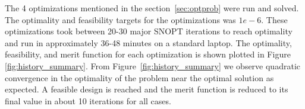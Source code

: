 \documentclass[conf]{new-aiaa}
\begin{document}

The 4 optimizations mentioned in the section~\ref{sec:optprob} were run and solved.
The optimality and feasibility targets for the optimizations was $1e-6$.
These optimizations took between 20-30 major SNOPT iterations to reach optimality and run in approximately 36-48 minutes on a standard laptop.
The optimality, feasibility, and merit function for each optimization is shown plotted in Figure \ref{fig:history_summary}.
From Figure~\ref{fig:history_summary} we observe quadratic convergence in the optimality of the problem near the optimal solution as expected.
A feasible design is reached and the merit function is reduced to its final value in about 10 iterations for all cases.
\end{document}
